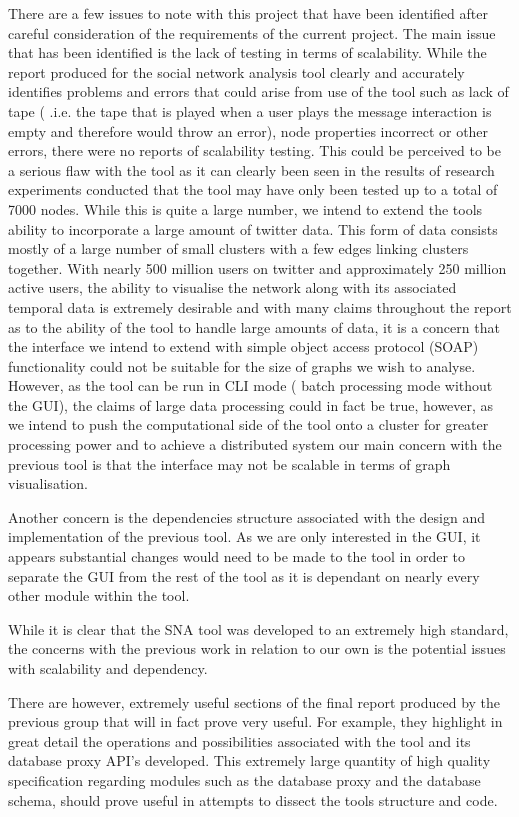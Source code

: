 There are a few issues to note with this project that have been identified after careful consideration of the requirements of the current project. The main issue that has been identified is the lack of testing in terms of scalability. While the report produced for the social network analysis tool clearly and accurately identifies problems and errors that could arise from use of the tool such as lack of tape ( .i.e. the tape that is played when a user plays the message interaction is empty and therefore would throw an error), node properties incorrect or other errors, there were no reports of scalability testing. This could be perceived to be a serious flaw with the tool as it can clearly been seen in the results of research experiments conducted that the tool may have only been tested up to a total of 7000 nodes. While this is quite a large number, we intend to extend the tools ability to incorporate a large amount of twitter data. This form of data consists mostly of a large number of small clusters with a few edges linking clusters together. With nearly 500 million users on twitter and approximately 250 million active users, the ability to visualise the network along with its associated temporal data is extremely desirable and with many claims throughout the report as to the ability of the tool to handle large amounts of data, it is a concern that the interface we intend to extend with simple object access protocol (SOAP) functionality could not be suitable for the size of graphs we wish to analyse. However, as the tool can be run in CLI mode ( batch processing mode without the GUI), the claims of large data processing could in fact be true, however, as we intend to push the computational side of the tool onto a cluster for greater processing power and to achieve a distributed system our main concern with the previous tool is that the interface may not be scalable in terms of graph visualisation. 

Another concern is the dependencies structure associated with the design and implementation of the previous tool. As we are only interested in the GUI, it appears substantial changes would need to be made to the tool in order to separate the GUI from the rest of the tool as it is dependant on nearly every other module within the tool. 

While it is clear that the SNA tool was developed to an extremely high standard, the concerns with the previous work in relation to our own is the potential issues with scalability and dependency.

There are however, extremely useful sections of the final report produced by the previous group that will in fact prove very useful. For example, they highlight in great detail the operations and possibilities associated with the tool and its database proxy API's developed. This extremely large quantity of high quality specification regarding modules such as the database proxy and the database schema, should prove useful in attempts to dissect the tools structure and code.

